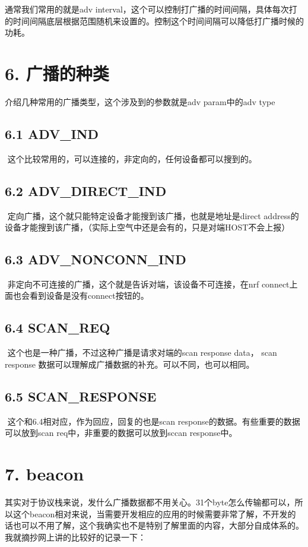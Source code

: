\documentclass[letterpaper,10pt,english]{sphinxmanual}
\begin{document}
通常我们常用的就是adv interval，这个可以控制打广播的时间间隔，具体每次打的时间间隔底层根据范围随机来设置的。控制这个时间间隔可以降低打广播时候的功耗。


\section{6. 广播的种类}
\label{\detokenize{test/ble_adv_scan_all:id6}}
介绍几种常用的广播类型，这个涉及到的参数就是adv param中的adv type


\subsection{6.1 ADV\_IND}
\label{\detokenize{test/ble_adv_scan_all:adv-ind}}
​    这个比较常用的，可以连接的，非定向的，任何设备都可以搜到的。


\subsection{6.2 ADV\_DIRECT\_IND}
\label{\detokenize{test/ble_adv_scan_all:adv-direct-ind}}
​    定向广播，这个就只能特定设备才能搜到该广播，也就是地址是direct address的设备才能搜到该广播，（实际上空气中还是会有的，只是对端HOST不会上报）


\subsection{6.3 ADV\_NONCONN\_IND}
\label{\detokenize{test/ble_adv_scan_all:adv-nonconn-ind}}
​     非定向不可连接的广播，这个就是告诉对端，该设备不可连接，在nrf connect上面也会看到设备是没有connect按钮的。


\subsection{6.4 SCAN\_REQ}
\label{\detokenize{test/ble_adv_scan_all:scan-req}}
​        这个也是一种广播，不过这种广播是请求对端的scan response data， scan response 数据可以理解成广播数据的补充。可以不同，也可以相同。


\subsection{6.5 SCAN\_RESPONSE}
\label{\detokenize{test/ble_adv_scan_all:scan-response}}
​         这个和6.4相对应，作为回应，回复的也是scan response的数据。有些重要的数据可以放到scan req中，非重要的数据可以放到sccan response中。


\section{7. beacon}
\label{\detokenize{test/ble_adv_scan_all:beacon}}
其实对于协议栈来说，发什么广播数据都不用关心。31个byte怎么传输都可以，所以这个beacon相对来说，当需要开发相应的应用的时候需要非常了解，不开发的话也可以不用了解，这个我确实也不是特别了解里面的内容，大部分自成体系的。我就摘抄网上讲的比较好的记录一下：
\end{document}
